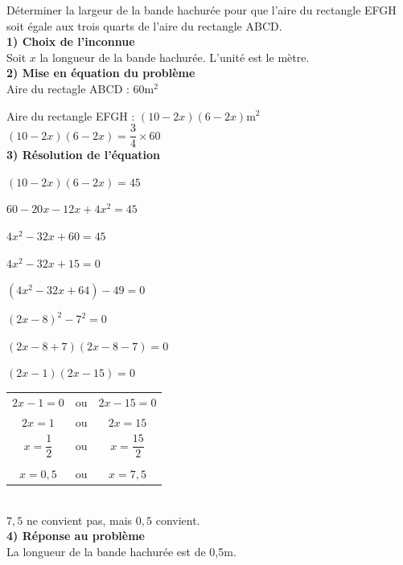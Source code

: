 Déterminer la largeur de la bande hachurée pour que l'aire du rectangle EFGH soit égale aux trois quarts de l'aire du rectangle ABCD. \\

\textbf{1) Choix de l'inconnue} \\

Soit $x$ la longueur de la bande hachurée. L'unité est le mètre. \\

\textbf{2) Mise en équation du problème} \\

Aire du rectagle ABCD : $60 $m$^2$

Aire du rectangle EFGH : $\left(10-2x\right)\left(6-2x\right)$m$^2$ \\

$ \left(10-2x\right)\left(6-2x\right) = \dfrac{3}{4} \times 60 $ \\

\textbf{3) Résolution de l'équation}

$ \left(10-2x\right)\left(6-2x\right) = 45 $

$ 60 - 20x - 12x + 4x^2  =45 $

$ 4x^2 - 32x + 60 = 45 $

$ 4x^2 - 32x + 15 = 0 $

$ \left(4x^2 - 32x  + 64\right)-49=0 $

$ \left(2x - 8\right)^2 - 7^2 = 0 $

$ \left(2x-8+7\right)\left(2x-8-7\right) = 0 $

$ \left(2x-1\right)\left(2x-15\right) = 0 $ \\

\begin{tabular}{ccc}
$2x-1=0$ & ou &$2x-15=0$ \\
$2x=1$ & ou & $2x = 15$ \\
$x=\dfrac{1}{2}$& ou &$ x = \dfrac{15}{2} $ \\
\\
$x=0,5$& ou &$x= 7,5$ \\
\end{tabular} \\

$7,5$ ne convient pas, mais $0,5$ convient. \\

\textbf{4) Réponse au problème} \\

La longueur de la bande hachurée est de 0,5m.

\newpage

